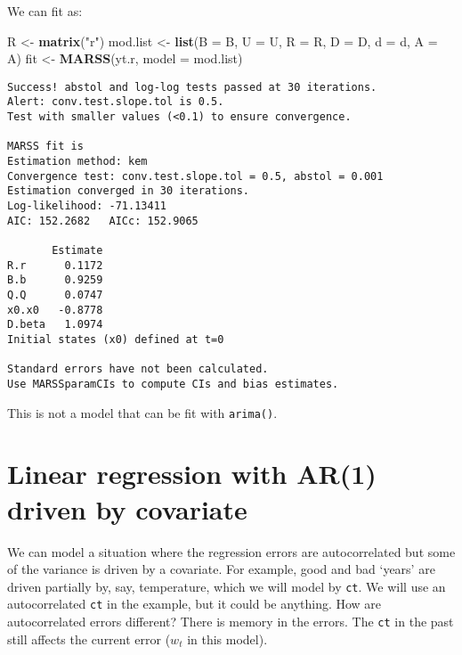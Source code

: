 \documentclass[12pt,]{book}
\newenvironment{Shaded}{\begin{snugshade}}{\end{snugshade}}
\newcommand{\DataTypeTok}[1]{\textcolor[rgb]{0.13,0.29,0.53}{#1}}
\newcommand{\KeywordTok}[1]{\textcolor[rgb]{0.13,0.29,0.53}{\textbf{#1}}}
\newcommand{\NormalTok}[1]{#1}
\newcommand{\StringTok}[1]{\textcolor[rgb]{0.31,0.60,0.02}{#1}}
\begin{document}
We can fit as:

\begin{Shaded}
\begin{Highlighting}[]
\NormalTok{R <-}\StringTok{ }\KeywordTok{matrix}\NormalTok{(}\StringTok{"r"}\NormalTok{)}
\NormalTok{mod.list <-}\StringTok{ }\KeywordTok{list}\NormalTok{(}\DataTypeTok{B =}\NormalTok{ B, }\DataTypeTok{U =}\NormalTok{ U, }\DataTypeTok{R =}\NormalTok{ R, }\DataTypeTok{D =}\NormalTok{ D, }\DataTypeTok{d =}\NormalTok{ d, }\DataTypeTok{A =}\NormalTok{ A)}
\NormalTok{fit <-}\StringTok{ }\KeywordTok{MARSS}\NormalTok{(yt.r, }\DataTypeTok{model =}\NormalTok{ mod.list)}
\end{Highlighting}
\end{Shaded}

\begin{verbatim}
Success! abstol and log-log tests passed at 30 iterations.
Alert: conv.test.slope.tol is 0.5.
Test with smaller values (<0.1) to ensure convergence.

MARSS fit is
Estimation method: kem 
Convergence test: conv.test.slope.tol = 0.5, abstol = 0.001
Estimation converged in 30 iterations. 
Log-likelihood: -71.13411 
AIC: 152.2682   AICc: 152.9065   
 
       Estimate
R.r      0.1172
B.b      0.9259
Q.Q      0.0747
x0.x0   -0.8778
D.beta   1.0974
Initial states (x0) defined at t=0

Standard errors have not been calculated. 
Use MARSSparamCIs to compute CIs and bias estimates.
\end{verbatim}

This is not a model that can be fit with \texttt{arima()}.

\hypertarget{linear-regression-with-ar1-driven-by-covariate}{%
\section{Linear regression with AR(1) driven by covariate}\label{linear-regression-with-ar1-driven-by-covariate}}

We can model a situation where the regression errors are autocorrelated but some of the variance is driven by a covariate. For example, good and bad `years' are driven partially by, say, temperature, which we will model by \texttt{ct}. We will use an autocorrelated \texttt{ct} in the example, but it could be anything. How are autocorrelated errors different? There is memory in the errors. The \texttt{ct} in the past still affects the current error (\(w_t\) in this model).
\end{document}
